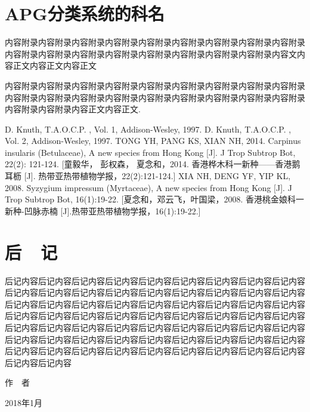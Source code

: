 \documentclass[utf8]{book}
\begin{document}


\appendix

\chapter{APG分类系统的科名}

内容附录内容附录内容附录内容附录内容附录内容附录内容附录内容附录内容附录内容附录内容附录内容附录内容附录内容附录内容附录内容附录内容附录内容文内容正文内容正文内容正文

内容附录内容附录内容附录内容附录内容附录内容附录内容附录内容附录内容附录内容附录内容附录内容附录内容附录内容附录内容附录内容附录内容附录内容附录内容附录内容附录内容正文内容正文\cite{DK1}.

\renewcommand\indexname{索~~引}
\printindex
{}

\backmatter


\begin{thebibliography}{参考文献}
 D. Knuth, T.A.O.C.P. , Vol. 1, Addison-Wesley, 1997.
 D. Knuth, T.A.O.C.P. , Vol. 2, Addison-Wesley, 1997.
 TONG YH, PANG KS, XIAN NH, 2014. Carpinus insularis (Betulaceae), A new species from Hong Kong [J]. J Trop Subtrop Bot, 22(2): 121-124. [童毅华， 彭权森， 夏念和，2014. 香港桦木科一新种——香港鹅耳枥 [J]. 热带亚热带植物学报，22(2):121-124.]
 XIA NH, DENG YF, YIP KL, 2008. Syzygium impressum (Myrtaceae), A new species from Hong Kong [J]. J Trop Subtrop Bot, 16(1):19-22. [夏念和，邓云飞，叶国梁，2008. 香港桃金娘科一新种-凹脉赤楠 [J].热带亚热带植物学报，16(1):19-22.]
\end{thebibliography}

\chapter{后~~记}

后记内容后记内容后记内容后记内容后记内容后记内容后记内容后记内容后记内容后记内容后记内容后记内容后记内容后记内容后记内容后记内容后记内容后记内容后记内容后记内容后记内容后记内容后记内容后记内容后记内容后记内容后记内容后记内容后记内容后记内容后记内容后记内容后记内容后记内容后记内容后记内容后记内容后记内容后记内容后记内容后记内容后记内容后记内容后记内容后记内容后记内容后记内容后记内容后记内容后记内容后记内容后记内容后记内容后记内容后记内容后记内容后记内容后记内容后记内容后记内容后记内容后记内容后记内容后记内容后记内容

\begin{flushright}
作~~者~~~~~~~~~

2018年1月~~~~~
\end{flushright}
\end{document}
